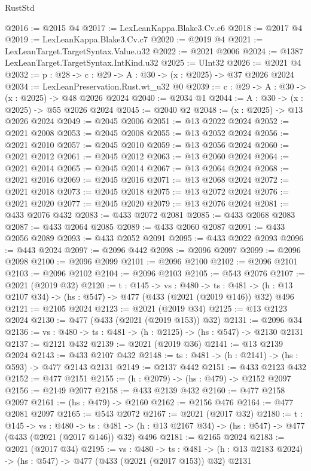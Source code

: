 \begin{lexlean}{RustStd}
\begin{coremodule}
{\begin{coremodule}
{{{{{{{{{{{{{{{{@2016 := @2015 @4
@2017 := LexLeanKappa.Blake3.Cv.c6
@2018 := @2017 @4
@2019 := LexLeanKappa.Blake3.Cv.c7
@2020 := @2019 @4
@2021 := LexLeanTarget.TargetSyntax.Value.u32
@2022 := @2021 @2006
@2024 := @1387 LexLeanTarget.TargetSyntax.IntKind.u32
@2025 := UInt32
@2026 := @2021 @4
@2032 := {p : @28} -> {c : @29} -> {A : @30} -> (x : @2025) -> @37 @2026 @2024
@2034 := LexLeanPreservation.Rust.wt_u32 @0
@2039 := {c : @29} -> {A : @30} -> (x : @2025) -> @48 @2026 @2024
@2040 := @2034 @1
@2044 := {A : @30} -> (x : @2025) -> @55 @2026 @2024
@2045 := @2040 @2
@2048 := (x : @2025) -> @13 @2026 @2024
@2049 := @2045 @2006
@2051 := @13 @2022 @2024
@2052 := @2021 @2008
@2053 := @2045 @2008
@2055 := @13 @2052 @2024
@2056 := @2021 @2010
@2057 := @2045 @2010
@2059 := @13 @2056 @2024
@2060 := @2021 @2012
@2061 := @2045 @2012
@2063 := @13 @2060 @2024
@2064 := @2021 @2014
@2065 := @2045 @2014
@2067 := @13 @2064 @2024
@2068 := @2021 @2016
@2069 := @2045 @2016
@2071 := @13 @2068 @2024
@2072 := @2021 @2018
@2073 := @2045 @2018
@2075 := @13 @2072 @2024
@2076 := @2021 @2020
@2077 := @2045 @2020
@2079 := @13 @2076 @2024
@2081 := @433 @2076 @432
@2083 := @433 @2072 @2081
@2085 := @433 @2068 @2083
@2087 := @433 @2064 @2085
@2089 := @433 @2060 @2087
@2091 := @433 @2056 @2089
@2093 := @433 @2052 @2091
@2095 := @433 @2022 @2093
@2096 := @443 @2024
@2097 := @2096 @442
@2098 := @2096 @2097
@2099 := @2096 @2098
@2100 := @2096 @2099
@2101 := @2096 @2100
@2102 := @2096 @2101
@2103 := @2096 @2102
@2104 := @2096 @2103
@2105 := @543 @2076
@2107 := @2021 (@2019 @32)
@2120 := {t : @145} ->
  {vs : @480} ->
  {ts : @481} -> (h : @13 @2107 @34) -> (hs : @547) -> @477 (@433 (@2021 (@2019 @146)) @32) @496
@2121 := @2105 @2024
@2123 := @2021 (@2019 @34)
@2125 := @13 @2123 @2024
@2130 := @477 (@433 (@2021 (@2019 @153)) @32)
@2131 := @2096 @34
@2136 := {vs : @480} -> {ts : @481} -> (h : @2125) -> (hs : @547) -> @2130 @2131
@2137 := @2121 @432
@2139 := @2021 (@2019 @36)
@2141 := @13 @2139 @2024
@2143 := @433 @2107 @432
@2148 := {ts : @481} -> (h : @2141) -> (hs : @593) -> @477 @2143 @2131
@2149 := @2137 @442
@2151 := @433 @2123 @432
@2152 := @477 @2151
@2155 := (h : @2079) -> (hs : @479) -> @2152 @2097
@2156 := @2149 @2077
@2158 := @433 @2139 @432
@2160 := @477 @2158 @2097
@2161 := (hs : @479) -> @2160
@2162 := @2156 @476
@2164 := @477 @2081 @2097
@2165 := @543 @2072
@2167 := @2021 (@2017 @32)
@2180 := {t : @145} ->
  {vs : @480} ->
  {ts : @481} -> (h : @13 @2167 @34) -> (hs : @547) -> @477 (@433 (@2021 (@2017 @146)) @32) @496
@2181 := @2165 @2024
@2183 := @2021 (@2017 @34)
@2195 := {vs : @480} ->
  {ts : @481} -> (h : @13 @2183 @2024) -> (hs : @547) -> @477 (@433 (@2021 (@2017 @153)) @32) @2131
}}}}}}}}}}}}}}}}
\end{coremodule}}
\end{coremodule}
\end{lexlean}
